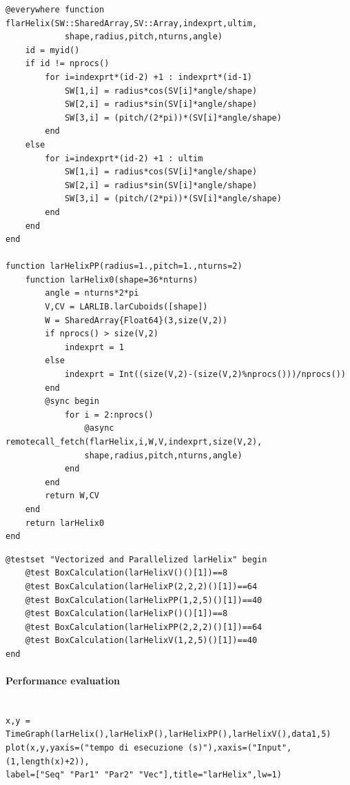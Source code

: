 \documentclass{article}
\begin{document}
\begin{Verbatim}
@everywhere function flarHelix(SW::SharedArray,SV::Array,indexprt,ultim,
            shape,radius,pitch,nturns,angle)
    id = myid()
    if id != nprocs()
        for i=indexprt*(id-2) +1 : indexprt*(id-1)
            SW[1,i] = radius*cos(SV[i]*angle/shape)  
            SW[2,i] = radius*sin(SV[i]*angle/shape)
            SW[3,i] = (pitch/(2*pi))*(SV[i]*angle/shape)
        end
    else
        for i=indexprt*(id-2) +1 : ultim
            SW[1,i] = radius*cos(SV[i]*angle/shape)  
            SW[2,i] = radius*sin(SV[i]*angle/shape)
            SW[3,i] = (pitch/(2*pi))*(SV[i]*angle/shape)
        end
    end
end

function larHelixPP(radius=1.,pitch=1.,nturns=2)
    function larHelix0(shape=36*nturns)
        angle = nturns*2*pi
        V,CV = LARLIB.larCuboids([shape])
        W = SharedArray{Float64}(3,size(V,2))
        if nprocs() > size(V,2)
            indexprt = 1
        else
            indexprt = Int((size(V,2)-(size(V,2)%nprocs()))/nprocs())
        end
        @sync begin
            for i = 2:nprocs()
                @async remotecall_fetch(flarHelix,i,W,V,indexprt,size(V,2),
                shape,radius,pitch,nturns,angle)
            end
        end
        return W,CV 
    end
    return larHelix0 
end
\end{Verbatim}

\begin{Verbatim}
@testset "Vectorized and Parallelized larHelix" begin
    @test BoxCalculation(larHelixV()()[1])==8
    @test BoxCalculation(larHelixP(2,2,2)()[1])==64
    @test BoxCalculation(larHelixPP(1,2,5)()[1])==40
    @test BoxCalculation(larHelixP()()[1])==8
    @test BoxCalculation(larHelixPP(2,2,2)()[1])==64
    @test BoxCalculation(larHelixV(1,2,5)()[1])==40
end
\end{Verbatim}

\paragraph{Performance evaluation}

\begin{Verbatim}

x,y = TimeGraph(larHelix(),larHelixP(),larHelixPP(),larHelixV(),data1,5)
plot(x,y,yaxis=("tempo di esecuzione (s)"),xaxis=("Input",(1,length(x)+2)),
label=["Seq" "Par1" "Par2" "Vec"],title="larHelix",lw=1)

\end{Verbatim}
\end{document}
